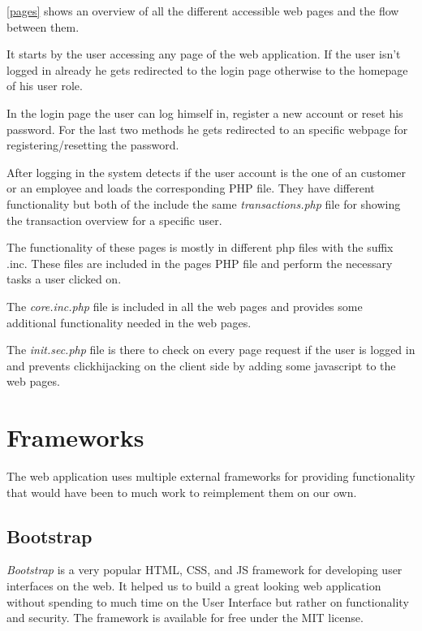 \documentclass[headsepline,footsepline,footinclude=false,oneside,fontsize=11pt,paper=a4,listof=totoc,bibliography=totoc]{scrbook} %
\begin{document}
\autoref{pages} shows an overview of all the different accessible web pages and the flow between them.

It starts by the user accessing any page of the web application. If the user isn't logged in already he gets redirected to the login page otherwise to the homepage of his user role.

In the login page the user can log himself in, register a new account or reset his password. For the last two methods he gets redirected to an specific webpage for registering/resetting the password.

After logging in the system detects if the user account is the one of an customer or an employee and loads the corresponding PHP file. They have different functionality but both of the include the same \textit{transactions.php} file for showing the transaction overview for a specific user.

The functionality of these pages is mostly in different php files with the suffix .inc. These files are included in the pages PHP file and perform the necessary tasks a user clicked on.

The \textit{core.inc.php} file is included in all the web pages and provides some additional functionality needed in the web pages.

The \textit{init.sec.php} file is there to check on every page request if the user is logged in and prevents clickhijacking on the client side by adding some javascript to the web pages.

\pagebreak

\section{Frameworks}

The web application uses multiple external frameworks for providing functionality that would have been to much work to reimplement them on our own.

\subsection{Bootstrap}

\textit{Bootstrap} is a very popular HTML, CSS, and JS framework for developing user interfaces on the web. It helped us to build a great looking web application without spending to much time on the User Interface but rather on functionality and security.
The framework is available for free under the MIT license.
\end{document}
